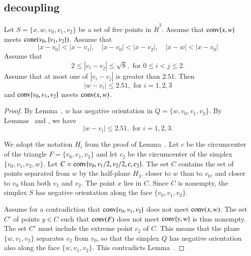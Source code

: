 \begin{tarskidata}
\begin{tarski}
\subsection{decoupling}

\begin{lemma}
Let $S=\{x,w,v_0,v_1,v_2\}$ be a set of five points
in $\ring{R}^3$.  Assume that
  ${\operatorname{conv}}\{x,w\}$ meets ${\operatorname{cone}}(v_0,\{v_1,v_2\})$.  
Assume that
  $$
  |x-v_0| < |x-v_1|,\quad 
  |x-v_0| < |x-v_2|,\quad
  |x-w| < |x-v_0|
  $$
Assume that 
  $$
  2\le |v_i-v_j|\le \sqrt{8}, \text{ for } 0\le i < j \le 2.
  $$
Assume that at most one of $|v_i-v_j|$ is greater than $2.51$.
Then
  $$|w-v_i|\le 2.51,\text{ for } i=1,2,3$$
and ${\operatorname{conv}}\{v_0,v_1,v_2\}$ meets ${\operatorname{conv}}(x,w)$.
\end{lemma}


\begin{proof}
By Lemma~, $w$ has negative orientation
in $Q=\{w,v_0,v_1,v_2\}$.
By
Lemmas~ and ,
we have
  $$|w-v_i|\le 2.51,\text{ for } i=1,2,3.$$

We adopt the notation $H_i$ from the proof of
Lemma~.
Let $c$ be the circumcenter of the triangle $F=\{v_0,v_1,v_2\}$ and
let $c_2$ be the circumcenter of the simplex $\{v_0,v_1,v_2,w\}$.
Let $C={\operatorname{conv}}\{v_0,v_1/2,v_2/2,c,c_2\}$.  The set
$C$ contains the set of points separated from $w$ by the
half-plane $H_3$, closer to $w$ than to $v_0$, and closer to $v_0$
than both $v_1$ and $v_2$. The point $x$ lies in
$C$. Since $C$ is nonempty, the simplex $S$ has
negative orientation along the face $\{v_0,v_1,v_2\}$.

Assume for a contradiction that ${\operatorname{conv}}\{v_0,v_1,v_2\}$
does not meet ${\operatorname{conv}}(x,w)$.
The set $C'$ of points $y\in C$ such that 
  ${\operatorname{conv}}(F)$ does not meet ${\operatorname{conv}}\{y,w\}$ is thus
nonempty. The set $C'$ must include the extreme point $c_2$ of
$C$. This means that the plane $\{w,v_1,v_2\}$ separates $c_2$
from $v_0$, so that the simplex $Q$ has negative orientation
also along the face $\{w,v_1,v_2\}$.  This contradicts
Lemma~.
\end{proof}
\end{tarski}







\end{tarskidata}
